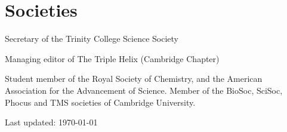 \documentclass[letterpaper]{article}
\renewenvironment{itemize}{
  \begin{list}{}{
    \setlength{\leftmargin}{1.5em}
  }
}{
  \end{list}
}
\begin{document}


\section*{Societies}
\begin{itemize}
	\item Secretary of the Trinity College Science Society
	\item Managing editor of The Triple Helix (Cambridge Chapter)
\end{itemize}
Student member of the Royal Society of Chemistry, and the American Association for the Advancement of Science. Member of the BioSoc, SciSoc, Phocus and TMS societies of Cambridge University.




\bigskip

\begin{center}
\begin{footnotesize}
Last updated: \today \\
\end{footnotesize}
\end{center}
\end{document}
